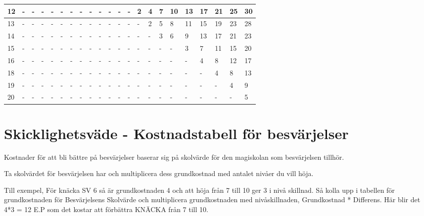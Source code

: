 \documentclass[a4paper, 10pt, titlepage]{article}
\begin{document}
\begin{table}[hbp]
\begin{tabular}{|l|l|l|l|l|l|l|l|l|l|l|l|l|l|l|l|l|l|l|l|l|l|}
    \hline
    12     & - & - & - & - & - & - & - & - & - &  - &  - &  - & 2  &  4 &  7 & 10  & 13 & 17 & 21 & 25 & 30 \\
    \hline
    13     & - & - & - & - & - & - & - & - & - &  - &  - &  - &  - &  2 & 5  &  8 & 11 & 15 & 19 & 23 & 28 \\
    \hline
    14     & - & - & - & - & - & - & - & - & - &  - &  - &  - &  - &  - & 3  &  6 & 9 & 13 & 17 &  21 & 23 \\
    \hline
    15     & - & - & - & - & - & - & - & - & - &  - &  - &  - &  - &  - & -  & -  & 3 &  7 & 11 & 15 & 20 \\
    \hline
    16     & - & - & - & - & - & - & - & - & - &  - &  - &  - &  - &  - & -  & -  & - &  4 & 8 & 12 & 17 \\
    \hline
    18     & - & - & - & - & - & - & - & - & - &  - &  - &  - &  - &  - & -  &  - & - & -  & 4 & 8  & 13 \\
    \hline
    19     & - & - & - & - & - & - & - & - & - &  - &  - &  - &  - &  - & -  &  - & - & -  & -  & 4 & 9 \\
    \hline
    20     & - & - & - & - & - & - & - & - & - &  - &  - &  - &  - &  - & -  &  - & - & -  & -  & - & 5 \\
    \hline
  \end{tabular}
\end{table}



\section{Skicklighetsväde - Kostnadstabell för besvärjelser}
Kostnader för att bli bättre på besvärjelser baserar sig på skolvärde för den magiskolan
som besvärjelsen tillhör.

Ta skolvärdet för besvärjelsen har och multiplicera dess grundkostnad med antalet nivåer
du vill höja.

Till exempel, För knäcka SV 6 så är grundkostnaden 4 och att höja från 7 till 10 ger 3 i nivå skillnad.
Så kolla upp i tabellen för grundkostnaden för Besvärjelsens Skolvärde och multiplicera
grundkostnaden med nivåskillnaden, Grundkostnad * Differens. Här blir det 4*3 = 12 E.P som det kostar
att förbättra KNÄCKA från 7 till 10.
\end{document}
